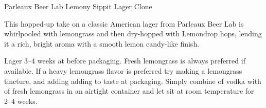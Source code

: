 \stylesection{\styleamericanlager}

\begin{recipie}{Parleaux Beer Lab Lemony Sippit Lager Clone}

\begin{aboutblock}
This hopped-up take on a classic American lager from Parleaux Beer Lab is
whirlpooled with lemongrass and then dry-hopped with Lemondrop hops, lending it
a rich, bright aroma with a smooth lemon candy-like finish. \sourceaha
\end{aboutblock}


\begin{methodandtiming}
  
\begin{mashsteps}
\end{mashsteps}

\begin{fermentationsteps}
\end{fermentationsteps}

\begin{directions}
Lager 3--4 weeks at  before packaging. Fresh lemongrass is always
preferred if available. If a heavy lemongrass flavor is preferred try making
a lemongrass tincture, and adding adding to taste at packaging. Simply combine
 of vodka with  of fresh lemongrass in an airtight container
and let sit at room temperature for 2--4 weeks.
\end{directions}

\end{methodandtiming}

\pagebreak

\begin{ingredientsblock}

\begin{malts}
\end{malts}

\begin{hops}
\end{hops}


\end{ingredientsblock}

\end{recipie}

